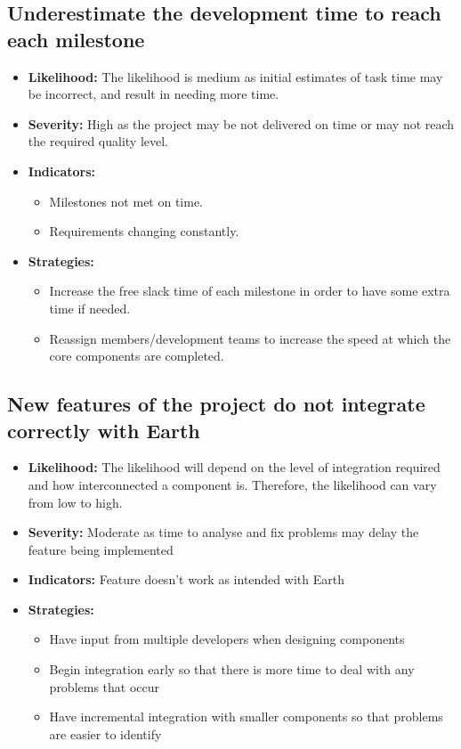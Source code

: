 \documentclass{article}
\begin{document}
\subsection{Underestimate the development time to reach each milestone}
\begin{itemize}
	\item \textbf{Likelihood:} The likelihood is medium as initial estimates of task time may be incorrect, and result in needing more time. 
	\item \textbf{Severity:} High as the project may be not delivered on time or may not reach the required quality level. 
	\item \textbf{Indicators:}
		\begin{itemize}
			\item Milestones not met on time.
			\item Requirements changing constantly.
		\end{itemize}
	\item \textbf{Strategies:} 
		\begin{itemize}
			\item Increase the free slack time of each milestone in order to have some extra time if needed.
			\item Reassign members/development teams to increase the speed at which the core components are completed.
		\end{itemize}
\end{itemize}

\subsection{New features of the project do not integrate correctly with Earth}
\begin{itemize}
	\item \textbf{Likelihood:} The likelihood will depend on the level of integration required and how interconnected a component is. Therefore, the likelihood can vary from low to high.
	\item \textbf{Severity:} Moderate as time to analyse and fix problems may delay the feature being implemented
	\item \textbf{Indicators:} Feature doesn't work as intended with Earth
	\item \textbf{Strategies:} 
		\begin{itemize}
			\item Have input from multiple developers when designing components
			\item Begin integration early so that there is more time to deal with any problems that occur
			\item Have incremental integration with smaller components so that problems are easier to identify
		\end{itemize}
\end{itemize}
\end{document}
